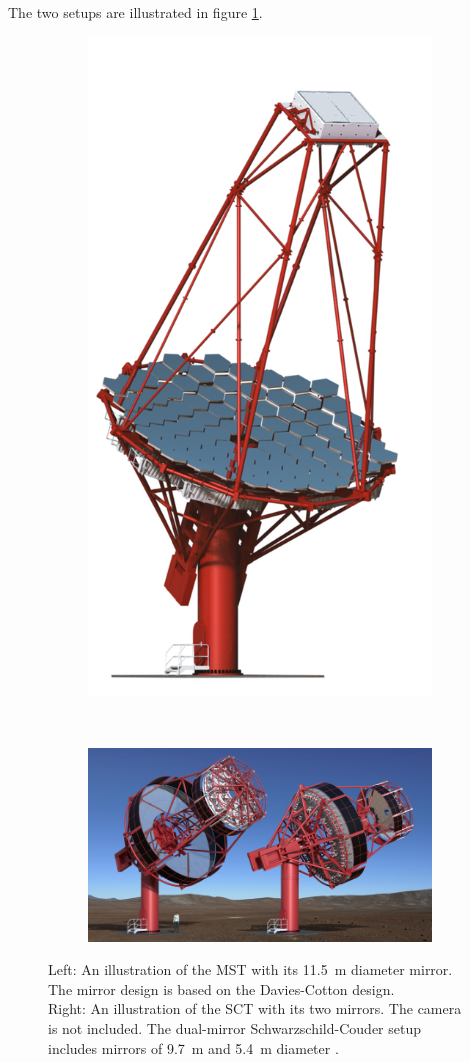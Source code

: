 The two setups are illustrated in figure \ref{fig:mst_comp}.

\begin{figure}
    \centering
    \begin{subfigure}[t]{0.35\textwidth}
        \centering
		\captionsetup{width=0.9\linewidth}
		\includegraphics[width=.45\textwidth]{images/MST-1.png}
    \end{subfigure}%
	~
    \begin{subfigure}[t]{0.55\textwidth}
        \centering
		\captionsetup{width=0.9\linewidth}
		\includegraphics[width=.9\textwidth]{images/SCT.png}
    \end{subfigure}
    \caption{
	Left: An illustration of the MST with its
		\SI{11.5}{\meter} diameter mirror.
		The mirror design is based on the Davies-Cotton design. \\
	Right: An illustration of the SCT with its
		two mirrors. The camera is not included.
		The dual-mirror Schwarzschild-Couder setup includes mirrors of
		\SI{9.7}{\meter} and \SI{5.4}{\meter} diameter \cite{cta_web}.}
	\label{fig:mst_comp}
\end{figure}


